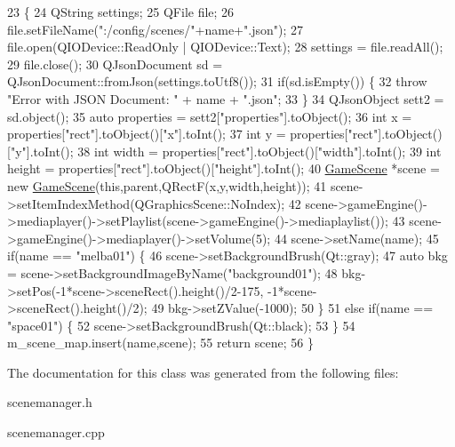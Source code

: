 \begin{DoxyCode}
23                                                                         \{
24     QString settings;
25     QFile file;
26     file.setFileName(\textcolor{stringliteral}{":/config/scenes/"}+name+\textcolor{stringliteral}{".json"});
27     file.open(QIODevice::ReadOnly | QIODevice::Text);
28     settings = file.readAll();
29     file.close();
30     QJsonDocument sd = QJsonDocument::fromJson(settings.toUtf8());
31     \textcolor{keywordflow}{if}(sd.isEmpty()) \{
32         \textcolor{keywordflow}{throw} \textcolor{stringliteral}{"Error with JSON Document: "} + name + \textcolor{stringliteral}{".json"};
33     \}
34     QJsonObject sett2 = sd.object();
35     \textcolor{keyword}{auto} properties = sett2[\textcolor{stringliteral}{"properties"}].toObject();
36     \textcolor{keywordtype}{int} x = properties[\textcolor{stringliteral}{"rect"}].toObject()[\textcolor{stringliteral}{"x"}].toInt();
37     \textcolor{keywordtype}{int} y = properties[\textcolor{stringliteral}{"rect"}].toObject()[\textcolor{stringliteral}{"y"}].toInt();
38     \textcolor{keywordtype}{int} width = properties[\textcolor{stringliteral}{"rect"}].toObject()[\textcolor{stringliteral}{"width"}].toInt();
39     \textcolor{keywordtype}{int} height = properties[\textcolor{stringliteral}{"rect"}].toObject()[\textcolor{stringliteral}{"height"}].toInt();
40     \hyperlink{class_game_scene}{GameScene} *scene = \textcolor{keyword}{new} \hyperlink{class_game_scene}{GameScene}(\textcolor{keyword}{this},parent,QRectF(x,y,width,height));
41     scene->setItemIndexMethod(QGraphicsScene::NoIndex);
42     scene->gameEngine()->mediaplayer()->setPlaylist(scene->gameEngine()->mediaplaylist());
43     scene->gameEngine()->mediaplayer()->setVolume(5);
44     scene->setName(name);
45     \textcolor{keywordflow}{if}(name == \textcolor{stringliteral}{"melba01"}) \{
46         scene->setBackgroundBrush(Qt::gray);
47         \textcolor{keyword}{auto} bkg = scene->setBackgroundImageByName(\textcolor{stringliteral}{"background01"});
48         bkg->setPos(-1*scene->sceneRect().height()/2-175, -1*scene->sceneRect().height()/2);
49         bkg->setZValue(-1000);
50     \}
51     \textcolor{keywordflow}{else} \textcolor{keywordflow}{if}(name == \textcolor{stringliteral}{"space01"}) \{
52         scene->setBackgroundBrush(Qt::black);
53     \}
54     m\_scene\_map.insert(name,scene);
55     \textcolor{keywordflow}{return} scene;
56 \}
\end{DoxyCode}


The documentation for this class was generated from the following files\+:\begin{DoxyCompactItemize}
\item 
scenemanager.\+h\item 
scenemanager.\+cpp\end{DoxyCompactItemize}
